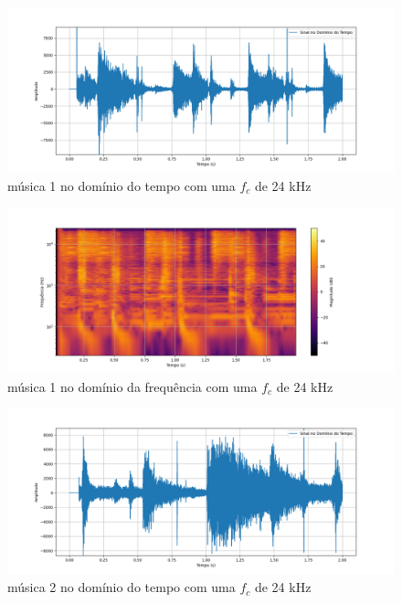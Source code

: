 \begin{anexosenv}
\begin{figure}[h]
	\centering
    \includegraphics[width=\textwidth]{figuras/fig30.png}
	\caption{música 1 no domínio do tempo com uma $f_c$ de 24 kHz}
	\label{fig30}
\end{figure}

\begin{figure}[h]
	\centering
    \includegraphics[width=\textwidth]{figuras/fig31.png}
	\caption{música 1 no domínio da frequência com uma $f_c$ de 24 kHz}
	\label{fig31}
\end{figure}

\begin{figure}[h]
	\centering
    \includegraphics[width=\textwidth]{figuras/fig32.png}
	\caption{música 2 no domínio do tempo com uma $f_c$ de 24 kHz}
	\label{fig32}
\end{figure}


\end{anexosenv}
